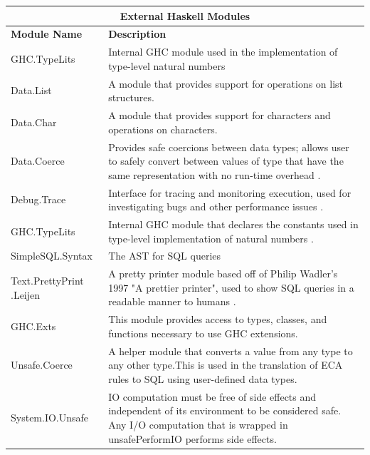\documentclass[12pt]{report}
\begin{document}
\begin{adjustbox}{center}
\begin{tabular}{ |p{3.2cm}|p{11cm}|  }
    \hline
    \multicolumn{2}{|c|}{\bfseries{\large{External Haskell Modules}}} \\
    \hline\hline
    \bfseries{Module Name} & \bfseries{Description}\\
    \hline
    GHC.TypeLits   & Internal GHC module used in the implementation of 
    type-level natural numbers \cite{hackage}    \\ 
    \hline
    Data.List & A module that provides support for operations on list 
    structures.  \\
    \hline
    Data.Char &  A module that provides support for characters and operations 
    on characters.  \\
    \hline
    Data.Coerce  & Provides safe coercions between data types; allows user to 
    safely convert between values of type that have the same representation 
    with no run-time overhead \cite{hackage}.\\
    \hline
    Debug.Trace &  Interface for tracing and monitoring execution, used for 
    investigating bugs and other performance issues \cite{hackage}. \\ 
    \hline 
    GHC.TypeLits & Internal GHC module that declares the constants used in 
    type-level implementation of natural numbers \cite{hackage}.  \\ 
    \hline  
    SimpleSQL.Syntax&   The AST for SQL queries \cite{hackage}\\ 
    \hline
    Text.PrettyPrint .Leijen & A pretty printer module based 
    off of Philip Wadler's 1997 "A prettier printer", used to show SQL queries 
    in a readable manner to humans \cite{hackage}.\\ 
    \hline
    GHC.Exts & This module provides access to types, classes, and functions 
    necessary to use GHC extensions. \\ 
    \hline
    Unsafe.Coerce &  A helper module that converts a value from any type to any 
    other type.This is used in the translation of ECA rules to SQL using 
    user-defined data types. \\ 
    \hline
     System.IO.Unsafe & IO computation must be free of side effects and 
     independent of its environment to be considered safe. Any I/O computation 
     that is wrapped in unsafePerformIO performs side effects. \\
    \hline
\end{tabular}
\end{adjustbox}
\end{document}
